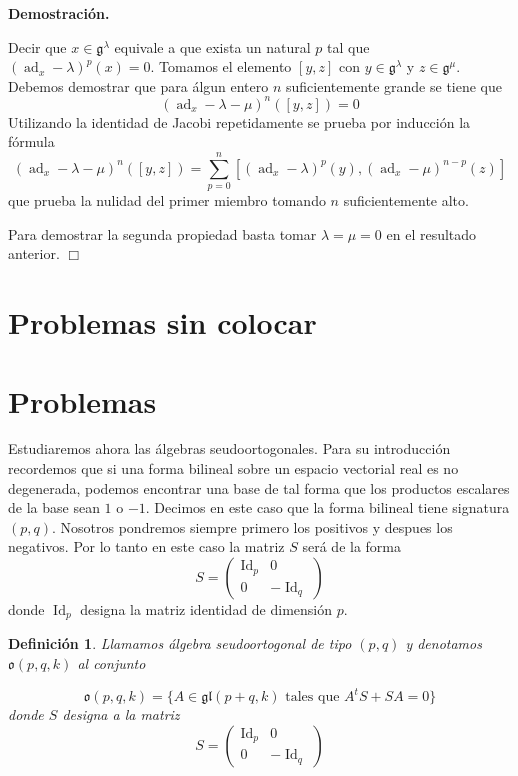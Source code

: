 \documentclass[a4paper,draft,12pt]{scrartcl}
\newtheorem{defi}{Definición}[section]%
\newcommand{\dem}{\noindent \textbf{Demostración. }\vspace{0.3 cm}}%
\newcommand{\g}{\mathfrak{g}}%
\newcommand{\fin}{ $\Box $ \vspace{0.4 cm}}
\newcommand{\df}[1]{\textsf{\color{blue}#1}}
\DeclareMathOperator{\Id}{Id}%
\DeclareMathOperator{\ad}{ad}  %
\begin{document}
 \dem
 
 Decir que $x \in \g^\lambda$ equivale a que exista un natural $p$ tal que $(\ad_x-\lambda)^p(x)=0$.  Tomamos el elemento $[y,z]$ con $y\in \g^\lambda$ y $z\in \g^\mu$. Debemos demostrar que para álgun entero $n$ suficientemente grande se tiene que
 $$
 (\ad_x-\lambda- \mu)^n ([y,z])=0
 $$
 Utilizando la identidad de Jacobi repetidamente se prueba por inducción la fórmula
 $$
 (\ad_x-\lambda- \mu)^n ([y,z])= \sum_{p=0}^n[(\ad_x-\lambda)^p(y), (\ad_x-\mu)^{n-p}(z)]
 $$ 
 que prueba la nulidad del primer miembro tomando $n$ suficientemente alto.
 
 Para demostrar la segunda propiedad basta tomar $\lambda=\mu=0$ en el resultado anterior.  \fin
 


\newpage

\section{Problemas sin colocar}



\section*{Problemas}



Estudiaremos ahora las álgebras seudoortogonales. Para su introducción recordemos que si una forma bilineal sobre un espacio vectorial real es no degenerada, podemos encontrar una base de tal forma que los productos escalares de la base sean $1$ o $-1$.  Decimos en este caso que la forma bilineal tiene signatura $(p,q)$.  Nosotros pondremos siempre primero los positivos y despues los negativos.  Por lo tanto en este caso la matriz $S$ será de la forma
$$
S= \begin{pmatrix}
\Id_p& 0 \\
0 & -\Id_q
\end{pmatrix}
$$
donde $\Id_p$ designa la matriz identidad de dimensión $p$.

\begin{defi}

Llamamos  \df{álgebra seudoortogonal} de tipo $(p,q)$  y denotamos $\mathfrak{o}(p,q, k)$ al conjunto 

$$
\mathfrak{o}(p,q,k)= \{A \in \mathfrak{gl}(p+q,k) \text{ tales que } A^tS+SA=0 \}
$$
donde $S$ designa a la matriz
$$
S= \begin{pmatrix}
\Id_p& 0 \\
0 & -\Id_q
\end{pmatrix}
$$

\end{defi}
\end{document}
